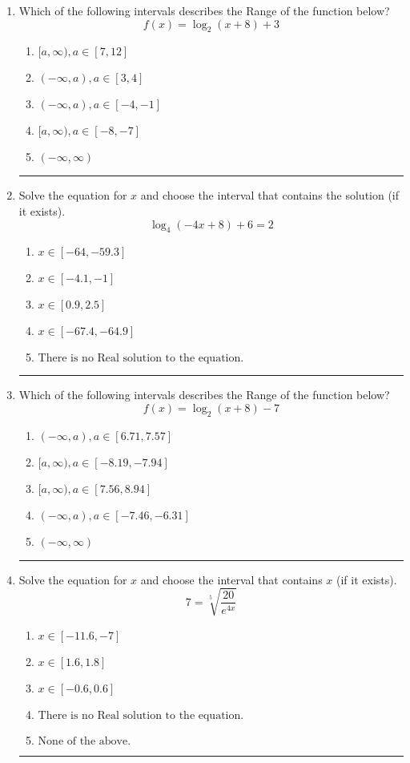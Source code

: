 \documentclass[14pt]{extbook}
\newcommand{\litem}[1]{\item#1\hspace*{-1cm}\rule{\textwidth}{0.4pt}}
\begin{document}
\begin{enumerate}
{\begin{enumerate}[label=\Alph*.]
\end{enumerate} }
\litem{
Which of the following intervals describes the Range of the function below?\[ f(x) = \log_2{(x+8)}+3 \]\begin{enumerate}[label=\Alph*.]
\item \( [a, \infty), a \in [7, 12] \)
\item \( (-\infty, a), a \in [3, 4] \)
\item \( (-\infty, a), a \in [-4, -1] \)
\item \( [a, \infty), a \in [-8, -7] \)
\item \( (-\infty, \infty) \)

\end{enumerate} }
\litem{
Solve the equation for $x$ and choose the interval that contains the solution (if it exists).\[ \log_{4}{(-4x+8)}+6 = 2 \]\begin{enumerate}[label=\Alph*.]
\item \( x \in [-64, -59.3] \)
\item \( x \in [-4.1, -1] \)
\item \( x \in [0.9, 2.5] \)
\item \( x \in [-67.4, -64.9] \)
\item \( \text{There is no Real solution to the equation.} \)

\end{enumerate} }
\litem{
Which of the following intervals describes the Range of the function below?\[ f(x) = \log_2{(x+8)}-7 \]\begin{enumerate}[label=\Alph*.]
\item \( (-\infty, a), a \in [6.71, 7.57] \)
\item \( [a, \infty), a \in [-8.19, -7.94] \)
\item \( [a, \infty), a \in [7.56, 8.94] \)
\item \( (-\infty, a), a \in [-7.46, -6.31] \)
\item \( (-\infty, \infty) \)

\end{enumerate} }
\litem{
 Solve the equation for $x$ and choose the interval that contains $x$ (if it exists).\[  7 = \sqrt[5]{\frac{20}{e^{4x}}} \]\begin{enumerate}[label=\Alph*.]
\item \( x \in [-11.6, -7] \)
\item \( x \in [1.6, 1.8] \)
\item \( x \in [-0.6, 0.6] \)
\item \( \text{There is no Real solution to the equation.} \)
\item \( \text{None of the above.} \)


\end{enumerate}}
\end{enumerate}
\end{document}
